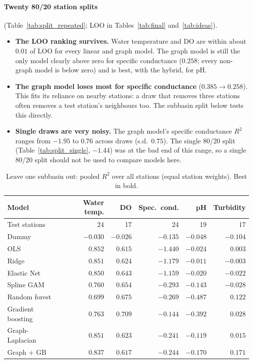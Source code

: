 \documentclass[11pt]{article}
\begin{document}
\paragraph{Twenty 80/20 station splits} (Table~\ref{tab:split_repeated}; LOO in
Tables~\ref{tab:final} and~\ref{tab:ideas}).
\begin{itemize}
  \item \textbf{The LOO ranking survives.} Water temperature and DO are within about $0.01$ of LOO
        for every linear and graph model. The graph model is still the only model clearly above zero
        for specific conductance ($0.258$; every non-graph model is below zero) and is best, with the
        hybrid, for pH.
  \item \textbf{The graph model loses most for specific conductance} ($0.385\to0.258$). This fits
        its reliance on nearby stations: a draw that removes three stations often removes a test
        station's neighbours too. The subbasin split below tests this directly.
  \item \textbf{Single draws are very noisy.} The graph model's specific conductance $R^2$ ranges
        from $-1.95$ to $0.76$ across draws (s.d.\ $0.75$). The single 80/20 split
        (Table~\ref{tab:split_single}, $-1.44$) was at the bad end of this range, so a single 80/20
        split should not be used to compare models here.
\end{itemize}

\begin{table}[h]
\centering
\small
\caption{Leave one subbasin out: pooled $R^2$ over all stations (equal station weights). Best in
bold.}
\label{tab:split_subbasin}
\begin{tabular}{l rrrrr}
\toprule
Model & Water temp. & DO & Spec.\ cond. & pH & Turbidity \\
\midrule
Test stations & 24 & 17 & 24 & 19 & 17 \\ \midrule
Dummy               & $-0.030$ & $-0.026$ & $\mathbf{-0.135}$ & $-0.048$ & $-0.104$ \\
OLS                 & $\mathbf{0.852}$ & $0.615$ & $-1.440$ & $-0.024$ & $0.003$ \\
Ridge               & $0.851$ & $0.624$ & $-1.179$ & $\mathbf{-0.011}$ & $-0.003$ \\
Elastic Net         & $0.850$ & $0.643$ & $-1.159$ & $-0.020$ & $-0.022$ \\
Spline GAM          & $0.760$ & $0.654$ & $-0.293$ & $-0.143$ & $-0.028$ \\
Random forest       & $0.699$ & $0.675$ & $-0.269$ & $-0.487$ & $0.122$ \\
Gradient boosting   & $0.763$ & $\mathbf{0.709}$ & $-0.144$ & $-0.392$ & $0.028$ \\
Graph-Laplacian     & $0.851$ & $0.623$ & $-0.241$ & $-0.119$ & $0.015$ \\
Graph + GB          & $0.837$ & $0.617$ & $-0.244$ & $-0.170$ & $\mathbf{0.171}$ \\
\bottomrule
\end{tabular}
\end{table}
\end{document}
